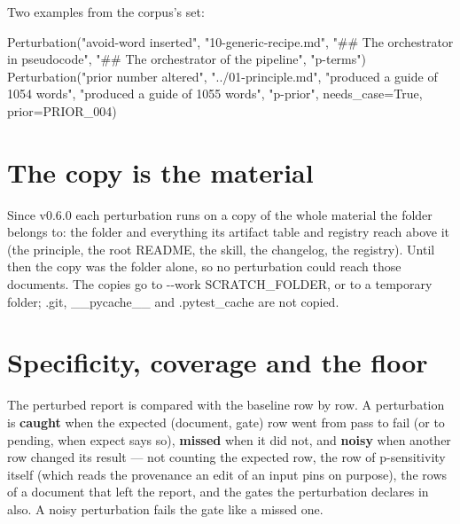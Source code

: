 \documentclass[
  american,
  10pt,
]{report}
\newenvironment{Shaded}{\begin{snugshade}}{\end{snugshade}}
\newcommand{\NormalTok}[1]{#1}
\renewenvironment{Shaded}{%
  \def\FrameCommand{{\color{rulecolor}\vrule width 2pt}\hspace{6pt}\colorbox{shadecolor}}%
  \MakeFramed{\advance\hsize-\width\FrameRestore}\small}%
  {\endMakeFramed}
\renewcommand{\texttt}[1]{{\ttfamily\hyphenchar\font=-1 #1}}
\begin{document}
Two examples from the corpus's set:

\begin{Shaded}
\begin{Highlighting}[]
\NormalTok{Perturbation("avoid{-}word inserted", "10{-}generic{-}recipe.md",}
\NormalTok{             "\#\# The orchestrator in pseudocode",}
\NormalTok{             "\#\# The orchestrator of the pipeline", "p{-}terms")}
\NormalTok{Perturbation("prior number altered", "../01{-}principle.md",}
\NormalTok{             "produced a guide of 1054 words", "produced a guide of 1055 words",}
\NormalTok{             "p{-}prior", needs\_case=True, prior=PRIOR\_004)}
\end{Highlighting}
\end{Shaded}

\section{The copy is the material}\label{the-copy-is-the-material}

Since v0.6.0 each perturbation runs on a copy of the whole material the
folder belongs to: the folder and everything its artifact table and
registry reach above it (the principle, the root README, the skill, the
changelog, the registry). Until then the copy was the folder alone, so
no perturbation could reach those documents. The copies go to
\texttt{-\allowbreak{}-\allowbreak{}work SCRATCH\_\allowbreak{}FOLDER},
or to a temporary folder; \texttt{.\allowbreak{}git},
\texttt{\_\allowbreak{}\_\allowbreak{}pycache\_\allowbreak{}\_\allowbreak{}}
and \texttt{.\allowbreak{}pytest\_\allowbreak{}cache} are not copied.

\section{Specificity, coverage and the
floor}\label{specificity-coverage-and-the-floor}

The perturbed report is compared with the baseline row by row. A
perturbation is \textbf{caught} when the expected (document, gate) row
went from pass to fail (or to pending, when \texttt{expect} says so),
\textbf{missed} when it did not, and \textbf{noisy} when another row
changed its result --- not counting the expected row, the row of
\texttt{p-\allowbreak{}sensitivity} itself (which reads the provenance
an edit of an input pins on purpose), the rows of a document that left
the report, and the gates the perturbation declares in \texttt{also}. A
noisy perturbation fails the gate like a missed one.
\end{document}
